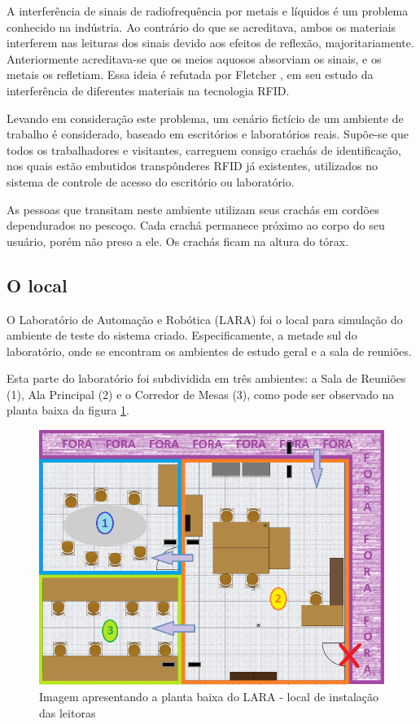  A interferência de sinais de radiofrequência por metais e líquidos  é um problema conhecido na indústria. Ao contrário do que se acreditava, ambos os materiais interferem nas leituras dos sinais devido aos efeitos de reflexão, majoritariamente. Anteriormente acreditava-se que os meios aquosos absorviam os sinais, e os metais os refletiam. Essa ideia é refutada por Fletcher \cite{fletcher2005study}, em seu estudo da interferência de diferentes materiais na tecnologia RFID.
 
 Levando em consideração este problema, um cenário fictício de um ambiente de trabalho é considerado, baseado em escritórios e laboratórios reais. Supõe-se que todos os trabalhadores e visitantes, carreguem consigo crachás de identificação, nos quais estão embutidos transpônderes RFID já existentes, utilizados no sistema de controle de acesso do escritório ou laboratório.
 
 As pessoas que transitam neste ambiente utilizam seus crachás em cordões dependurados no pescoço. Cada crachá permanece próximo ao corpo do seu usuário, porém não preso a ele. Os crachás ficam na altura do tórax.
 
 \subsection{O local}
 

 O Laboratório de Automação e Robótica (LARA) foi o local para simulação do ambiente de teste do sistema criado. Especificamente, a metade sul do laboratório, onde se encontram os ambientes de estudo geral e a sala de reuniões.
 
 Esta parte do laboratório foi subdividida em três ambientes: a Sala de Reuniões (1), Ala Principal (2) e o Corredor de Mesas (3), como pode ser observado na planta baixa da figura \ref{fig:LARA_planta}.

  \begin{figure}[H]
    \centering
    \includegraphics[width=0.9\linewidth]{figs/Metodologia/LARA_planta_ambientes.png}
    \caption{Imagem apresentando a planta baixa do LARA - local de instalação das leitoras}
    \label{fig:LARA_planta}
\end{figure}


